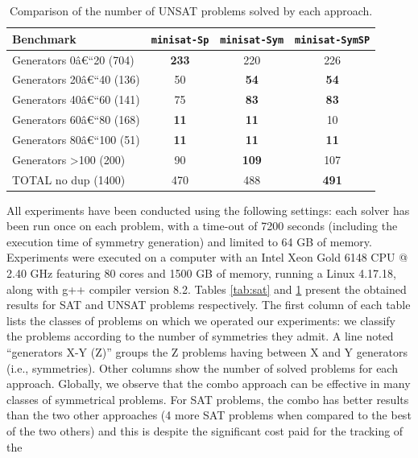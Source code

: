 \begin{table}\footnotesize
 \centering
 \begin{tabular}{l|ccc}
  \toprule
  Benchmark  &\texttt{minisat-Sp} & \texttt{minisat-Sym} & \texttt{minisat-SymSP}\\
  \hline 
  Generators 0â€“20 (704) & \cellcolor{gray!30,}\textbf{233}&220&226\\
  Generators 20â€“40 (136) & 50&\cellcolor{gray!30}\textbf{54}&\cellcolor{gray!30}\textbf{54}\\
  Generators 40â€“60 (141) & 75&\cellcolor{gray!30}\textbf{83}&\cellcolor{gray!30}\textbf{83}\\
  Generators 60â€“80 (168) & \cellcolor{gray!30}\textbf{11}&\cellcolor{gray!30}\textbf{11}&10\\
  Generators 80â€“100 (51) & \cellcolor{gray!30}\textbf{11}&\cellcolor{gray!30}\textbf{11}&\cellcolor{gray!30}\textbf{11}\\
  Generators \textgreater100 (200) & 90&\cellcolor{gray!30,}\textbf{109}&107\\
  \hline 
  TOTAL no dup (1400) & 470&488&\cellcolor{gray!30,}\textbf{491}\\
  \bottomrule
 \end{tabular}
 \caption{Comparison of the number of UNSAT problems solved by each approach.}
 \label{tab:unsat}
\end{table}
All experiments have been conducted using the following settings: each solver
has been run once on each problem, with a time-out of 7200 seconds (including
the execution time of symmetry generation) and limited to 64 GB of memory.
Experiments were executed on a computer with an Intel Xeon Gold 6148 CPU
@ 2.40 GHz featuring 80 cores and 1500 GB of memory, running a Linux 4.17.18,
along with g++ compiler version 8.2.
Tables \ref{tab:sat} and \ref{tab:unsat} present the obtained results for SAT
and UNSAT problems respectively. The first column of each table lists the
classes of problems on which we operated our experiments: we classify the
problems according to the number of symmetries they admit. A line noted
``generators X-Y (Z)'' groups the Z problems having between X and Y generators
(i.e., symmetries). Other columns show the number of solved problems for each
approach.
Globally, we observe that the combo approach can be effective in many classes
of symmetrical problems. For SAT problems, the combo has better results than the
two other approaches (4 more SAT problems when compared to the best of the two
others) and this is despite the significant cost paid for the tracking of the
